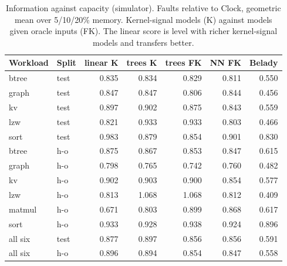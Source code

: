 \documentclass{article}
\newcommand{\clock}{Clock\xspace}
\newcommand{\belady}{Belady\xspace}
\begin{document}
\begin{table}[h]
\caption{Information against capacity (simulator). Faults relative to \clock, geometric
mean over 5/10/20\% memory. Kernel-signal models (K) against models given oracle inputs
(FK). The linear score is level with richer kernel-signal models and transfers better.}
\label{tab:info}
\vskip 0.05in
\begin{center}
\begin{footnotesize}
\setlength{\tabcolsep}{3pt}
\begin{tabular}{@{}llrrrrr@{}}
\toprule
Workload & Split & linear K & trees K & trees FK & NN FK & \belady \\
\midrule
btree  & test & 0.835 & 0.834 & 0.829 & 0.811 & 0.550 \\
graph  & test & 0.847 & 0.847 & 0.806 & 0.844 & 0.456 \\
kv     & test & 0.897 & 0.902 & 0.875 & 0.843 & 0.559 \\
lzw    & test & 0.821 & 0.933 & 0.933 & 0.803 & 0.466 \\
sort   & test & 0.983 & 0.879 & 0.854 & 0.901 & 0.830 \\
\midrule
btree  & h-o  & 0.875 & 0.867 & 0.853 & 0.847 & 0.615 \\
graph  & h-o  & 0.798 & 0.765 & 0.742 & 0.760 & 0.482 \\
kv     & h-o  & 0.902 & 0.903 & 0.900 & 0.854 & 0.577 \\
lzw    & h-o  & 0.813 & 1.068 & 1.068 & 0.812 & 0.409 \\
matmul & h-o  & 0.671 & 0.803 & 0.899 & 0.868 & 0.617 \\
sort   & h-o  & 0.933 & 0.928 & 0.938 & 0.924 & 0.896 \\
\midrule
all six & test & 0.877 & 0.897 & 0.856 & 0.856 & 0.591 \\
all six & h-o  & 0.896 & 0.894 & 0.854 & 0.847 & 0.558 \\
\bottomrule
\end{tabular}
\end{footnotesize}
\end{center}
\end{table}
\end{document}
